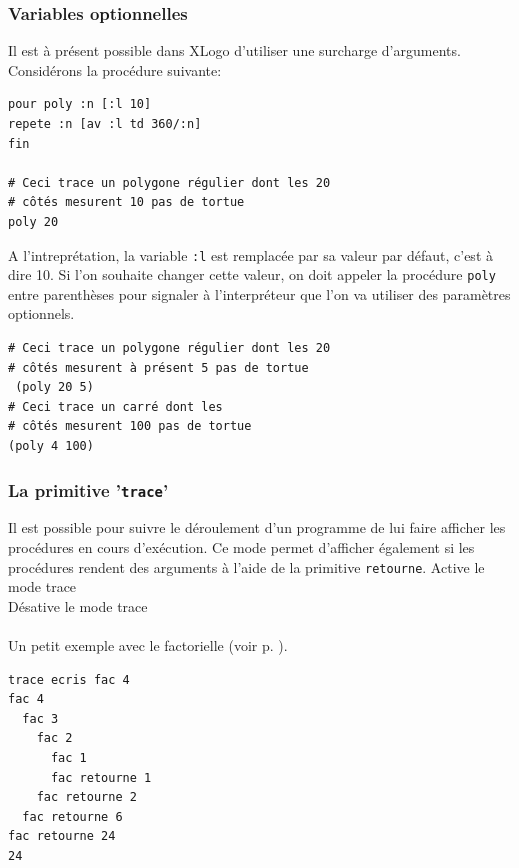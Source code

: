 \subsubsection{Variables optionnelles}
Il est à présent possible dans XLogo d'utiliser une \og surcharge \fg d'arguments. Considérons la procédure suivante:
\begin{verbatim}
pour poly :n [:l 10]
repete :n [av :l td 360/:n]
fin

# Ceci trace un polygone régulier dont les 20 
# côtés mesurent 10 pas de tortue 
poly 20 
\end{verbatim}

A l'intreprétation, la variable \texttt{:l} est remplacée par sa valeur par défaut, c'est à dire 10. Si l'on souhaite changer cette valeur, on doit appeler la procédure \texttt{poly} entre parenthèses pour signaler à l'interpréteur que l'on va utiliser des paramètres optionnels.

\begin{verbatim}
# Ceci trace un polygone régulier dont les 20 
# côtés mesurent à présent 5 pas de tortue 
 (poly 20 5)
# Ceci trace un carré dont les 
# côtés mesurent 100 pas de tortue 
(poly 4 100)
\end{verbatim}
\subsubsection{La primitive  '\texttt{trace}' }
Il est possible pour suivre le déroulement d'un programme de lui faire afficher les procédures en cours d'exécution. Ce mode permet d'afficher également si les procédures rendent des arguments à l'aide de la primitive \texttt{retourne}.
Active le mode trace\\
Désative le mode trace\\ \\
Un petit exemple avec le factorielle (voir p. \pageref{factorielle} ).
\begin{verbatim}
trace ecris fac 4
fac 4
  fac 3
    fac 2
      fac 1
      fac retourne 1
    fac retourne 2
  fac retourne 6
fac retourne 24
24
\end{verbatim}
